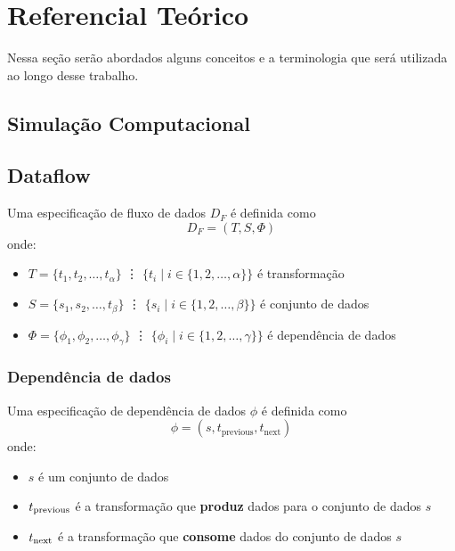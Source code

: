 
\chapter{Referencial Teórico}%
\label{chap:referencial-teorico}


Nessa seção serão abordados alguns conceitos e a terminologia que será utilizada ao longo desse trabalho.

\section{Simulação Computacional}

\section{Dataflow}

Uma especificação de fluxo de dados \( D_F \) é definida como \[ D_F = (T, S, \Phi) \] onde:
\begin{itemize}
    \item \( T = \{t_1, t_2, \ldots, t_{\alpha}\} \) \vdots{}
    \( \{t_i \mid i \in \{{1, 2, \ldots, \alpha}\} \} \)
    é transformação
    \item \( S = \{s_1, s_2, \ldots, t_{\beta}\} \) \vdots{}
    \( \{s_i \mid i \in \{{1, 2, \ldots, \beta}\} \} \)
    é conjunto de dados
    \item \( \Phi = \{\phi_1, \phi_2, \ldots, \phi_{\gamma}\} \) \vdots{}
    \( \{\phi_i \mid i \in \{{1, 2, \ldots, \gamma}\} \} \){}
    é dependência de dados
\end{itemize}



\subsection{Dependência de dados}

Uma especificação de dependência de dados \( \phi \) é definida como \[ \phi = (s, t_{\textrm{previous}}, t_{\textrm{next}}) \] onde:
\begin{itemize}
    \item \( s \) é um conjunto de dados
    \item \( t_{\textup{previous}} \) é a transformação que {\bf produz} dados para o conjunto de dados \( s \)
    \item \( t_{\textup{next}} \) é a transformação que {\bf consome} dados do conjunto de dados \( s \)
\end{itemize}

